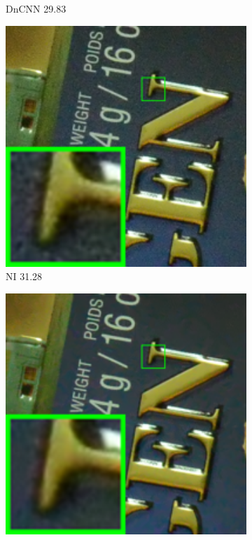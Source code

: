 \begin{figure}
\begin{subfigure}[t]{0.19\textwidth}
\caption{DnCNN 29.83}
    \end{subfigure}
\hfill
    \begin{subfigure}[t]{0.19\textwidth}
        \centering
        \includegraphics[width=1\textwidth]{images/twsc/cc/resize_br_NI_d800_iso6400_1_real.png}
\caption{NI 31.28}
    \end{subfigure}
\hfill
    \begin{subfigure}[t]{0.19\textwidth}
        \centering
        \includegraphics[width=1\textwidth]{images/twsc/cc/resize_br_NC_d800_iso6400_1_real.png}

\end{subfigure}
\end{figure}
